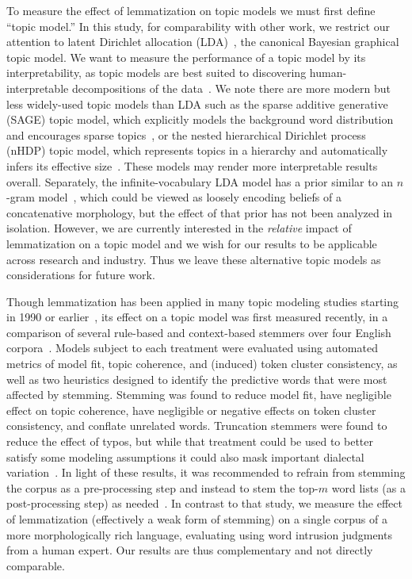 \documentclass[11pt,letterpaper]{article}
\begin{document}
{To measure the effect of lemmatization on topic models we must first
define ``topic model.''  In this study, for comparability with other
work, we restrict our attention to latent Dirichlet allocation
(LDA)~\cite{blei2003}, the canonical Bayesian graphical topic model.
We want to measure the performance of a topic model by its
interpretability, as topic models are best suited to discovering
human-interpretable decompositions of the data~\cite{may2015}.
We note there are more modern but less widely-used topic models than
LDA such as the sparse additive generative
(SAGE) topic model, which explicitly models the background word
distribution and encourages sparse topics~\cite{eisenstein2011}, or the
nested hierarchical Dirichlet process (nHDP) topic model, which
represents topics in a hierarchy and automatically infers its effective
size~\cite{paisley2015}.  These models may render more interpretable
results overall.  Separately, the infinite-vocabulary LDA model has a
prior similar to an $n$-gram model~\cite{zhai2013}, which could be
viewed as loosely encoding beliefs of a concatenative morphology, but
the effect of that prior has not been analyzed in isolation.  However,
we are currently interested in the \emph{relative} impact of
lemmatization on a topic model and we wish for our results to be
applicable across research and industry.  Thus we leave these
alternative topic models as considerations for future work.

Though lemmatization has been applied in many topic modeling studies
starting in 1990 or
earlier~\cite{deerwester1990,hofmann1999,mei2007,nallapati2008,lin2009},
its effect on a topic model was first measured recently, in a
comparison of several rule-based and context-based stemmers over four
English corpora~\cite{schofield2016}.  Models subject to each treatment
were evaluated using automated metrics of model fit, topic coherence,
and (induced) token cluster consistency, as well as two heuristics
designed to identify the predictive words that were most affected by
stemming.  Stemming was found to reduce model fit, have negligible
effect on topic coherence, have negligible or negative effects on token
cluster consistency, and conflate unrelated words.  Truncation stemmers
were found to reduce the effect of typos, but while that treatment
could be used to better satisfy some modeling assumptions it could
also mask important dialectal variation~\cite{schofield2016}.  In light
of these results, it was recommended to refrain from stemming the
corpus as a pre-processing step and instead to stem the top-$m$ word
lists (as a post-processing step) as
needed~\cite{schofield2016}.  In contrast to that study, we measure the
effect of lemmatization (effectively a weak form of stemming) on a
single corpus of a more morphologically rich language, evaluating using
word intrusion judgments from a human expert.  Our results are thus
complementary and not directly comparable.

}
\end{document}
